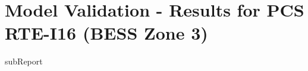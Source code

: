 




    \section{Model Validation - Results for PCS RTE-I16 (BESS Zone 3)}

    {{subReport}}
    \newpage

